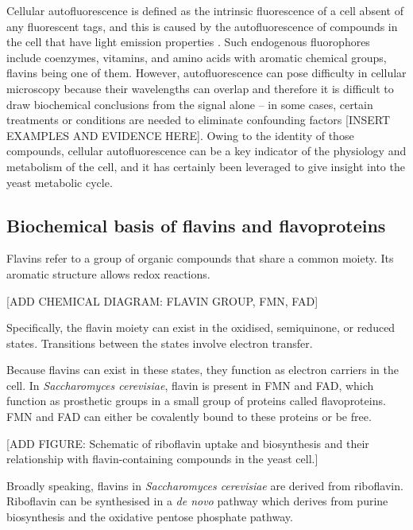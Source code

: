 Cellular autofluorescence is defined as the intrinsic fluorescence of a cell absent of any fluorescent tags, and this is caused by the autofluorescence of compounds in the cell that have light emission properties \parencite{maslankaAutofluorescenceYeastSaccharomyces2018}.
Such endogenous fluorophores include coenzymes, vitamins, and amino acids with aromatic chemical groups, flavins being one of them.
However, autofluorescence can pose difficulty in cellular microscopy because their wavelengths can overlap and therefore it is difficult to draw biochemical conclusions from the signal alone -- in some cases, certain treatments or conditions are needed to eliminate confounding factors [INSERT EXAMPLES AND EVIDENCE HERE].
Owing to the identity of those compounds, cellular autofluorescence can be a key indicator of the physiology and metabolism of the cell, and it has certainly been leveraged to give insight into the yeast metabolic cycle.

\subsection{Biochemical basis of flavins and flavoproteins}
\label{subsec:intro-flavin-biochem}
Flavins refer to a group of organic compounds that share a common moiety.
Its aromatic structure allows redox reactions.

[ADD CHEMICAL DIAGRAM: FLAVIN GROUP, FMN, FAD]

Specifically, the flavin moiety can exist in the oxidised, semiquinone, or reduced states.
Transitions between the states involve electron transfer.

Because flavins can exist in these states, they function as electron carriers in the cell.
In \emph{Saccharomyces cerevisiae}, flavin is present in FMN and FAD, which function as prosthetic groups in a small group of proteins called flavoproteins.
FMN and FAD can either be covalently bound to these proteins or be free.

[ADD FIGURE: Schematic of riboflavin uptake and biosynthesis and their relationship with flavin-containing compounds in the yeast cell.]

Broadly speaking, flavins in \emph{Saccharomyces cerevisiae} are derived from riboflavin.
Riboflavin can be synthesised in a \emph{de novo} pathway which derives from purine biosynthesis and the oxidative pentose phosphate pathway.

